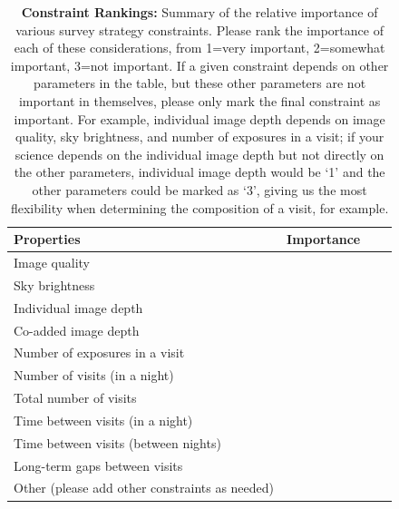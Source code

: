 \documentclass[11pt]{article}
\begin{document}
\begin{table}[ht]
    \centering
    \begin{tabular}{l|l|l|l}
        \toprule
        Properties & Importance \hspace{.3in} \\
        \midrule
        Image quality &     \\
        Sky brightness &  \\
        Individual image depth &   \\
        Co-added image depth &   \\
        Number of exposures in a visit   &   \\
        Number of visits (in a night)  &   \\ 
        Total number of visits &   \\
        Time between visits (in a night) &  \\
        Time between visits (between nights)  &   \\
        Long-term gaps between visits & \\
        Other (please add other constraints as needed) & \\
        \bottomrule
    \end{tabular}
    \caption{{\bf Constraint Rankings:} Summary of the relative importance of various survey strategy constraints. Please rank the importance of each of these considerations, from 1=very important, 2=somewhat important, 3=not important. If a given constraint depends on other parameters in the table, but these other parameters are not important in themselves, please only mark the final constraint as important. For example, individual image depth depends on image quality, sky brightness, and number of exposures in a visit; if your science depends on the individual image depth but not directly on the other parameters, individual image depth would be `1' and the other parameters could be marked as `3', giving us the most flexibility when determining the composition of a visit, for example.}
        \label{tab:obs_constraints}
\end{table}
\end{document}
